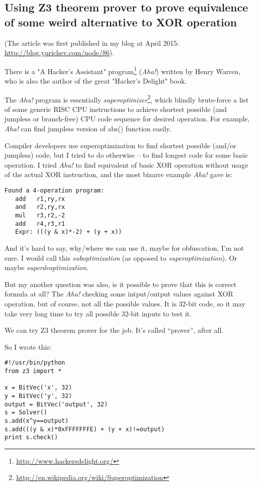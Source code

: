 \subsection{Using Z3 theorem prover to prove equivalence of some weird alternative to XOR operation}

(The article was first published in my blog at April 2015: \url{http://blog.yurichev.com/node/86}).

There is a "A Hacker's Assistant" program\footnote{\url{http://www.hackersdelight.org/}} (\textit{Aha!}) written by Henry Warren,
who is also the author of the great "Hacker's Delight" book.

The \textit{Aha!} program is essentially \textit{superoptimizer}\footnote{\url{http://en.wikipedia.org/wiki/Superoptimization}},
which blindly brute-force a list of some generic RISC CPU instructions to achieve shortest possible (and jumpless or branch-free) 
CPU code sequence for desired operation.
For example, \textit{Aha!} can find jumpless version of abs() function easily.

Compiler developers use superoptimization to find shortest possible (and/or jumpless) code, but I tried to do otherwise -- to find longest code for some basic operation.
I tried \textit{Aha!} to find equivalent of basic XOR operation without usage of the actual XOR instruction, and the most bizarre example \textit{Aha!} gave is:

\begin{lstlisting}
Found a 4-operation program:
   add   r1,ry,rx
   and   r2,ry,rx
   mul   r3,r2,-2
   add   r4,r3,r1
   Expr: (((y & x)*-2) + (y + x))
\end{lstlisting}

And it's hard to say, why/where we can use it, maybe for obfuscation, I'm not sure.
I would call this \textit{suboptimization} (as opposed to \textit{superoptimization}). Or maybe \textit{superdeoptimization}.

But my another question was also, is it possible to prove that this is correct formula at all?
The \textit{Aha!} checking some intput/output values against XOR operation, but of course, not all the possible values.
It is 32-bit code, so it may take very long time to try all possible 32-bit inputs to test it.

We can try Z3 theorem prover for the job. It's called ``prover'', after all.

So I wrote this:

\begin{lstlisting}
#!/usr/bin/python
from z3 import *

x = BitVec('x', 32)
y = BitVec('y', 32)
output = BitVec('output', 32)
s = Solver()
s.add(x^y==output)
s.add(((y & x)*0xFFFFFFFE) + (y + x)!=output)
print s.check()
\end{lstlisting}

